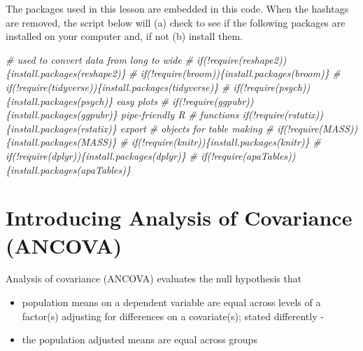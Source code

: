 \documentclass[
  11pt,
]{book}
\newenvironment{Shaded}{\begin{snugshade}}{\end{snugshade}}
\newcommand{\CommentTok}[1]{\textcolor[rgb]{0.37,0.37,0.37}{\textit{#1}}}
\providecommand{\tightlist}{%
  \setlength{\itemsep}{0pt}\setlength{\parskip}{0pt}}
\begin{document}
The packages used in this lesson are embedded in this code. When the hashtags are removed, the script below will (a) check to see if the following packages are installed on your computer and, if not (b) install them.

\begin{Shaded}
\begin{Highlighting}[]
\CommentTok{\# used to convert data from long to wide}
\CommentTok{\# if(!require(reshape2))\{install.packages(\textquotesingle{}reshape2\textquotesingle{})\}}
\CommentTok{\# if(!require(broom))\{install.packages(\textquotesingle{}broom\textquotesingle{})\}}
\CommentTok{\# if(!require(tidyverse))\{install.packages(\textquotesingle{}tidyverse\textquotesingle{})\}}
\CommentTok{\# if(!require(psych))\{install.packages(\textquotesingle{}psych\textquotesingle{})\} easy plots}
\CommentTok{\# if(!require(ggpubr))\{install.packages(\textquotesingle{}ggpubr\textquotesingle{})\} pipe{-}friendly R}
\CommentTok{\# functions if(!require(rstatix))\{install.packages(\textquotesingle{}rstatix\textquotesingle{})\} export}
\CommentTok{\# objects for table making}
\CommentTok{\# if(!require(MASS))\{install.packages(\textquotesingle{}MASS\textquotesingle{})\}}
\CommentTok{\# if(!require(knitr))\{install.packages(\textquotesingle{}knitr\textquotesingle{})\}}
\CommentTok{\# if(!require(dplyr))\{install.packages(\textquotesingle{}dplyr\textquotesingle{})\}}
\CommentTok{\# if(!require(apaTables))\{install.packages(\textquotesingle{}apaTables\textquotesingle{})\}}
\end{Highlighting}
\end{Shaded}

\hypertarget{introducing-analysis-of-covariance-ancova}{%
\section{Introducing Analysis of Covariance (ANCOVA)}\label{introducing-analysis-of-covariance-ancova}}

Analysis of covariance (ANCOVA) evaluates the null hypothesis that

\begin{itemize}
\tightlist
\item
  population means on a dependent variable are equal across levels of a factor(s) adjusting for differences on a covariate(s); stated differently -
\item
  the population adjusted means are equal across groups
\end{itemize}
\end{document}
